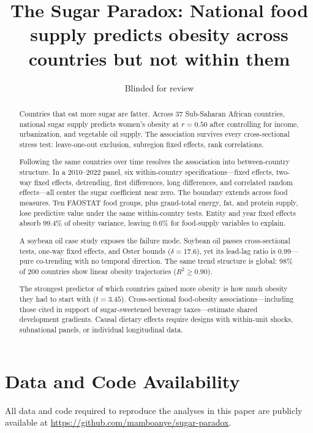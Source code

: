 \documentclass[11pt]{article}
\title{The Sugar Paradox: National food supply predicts obesity across countries but not within them}
\author{Blinded for review}
\date{}
\begin{document}
\maketitle

\begin{abstract}
Countries that eat more sugar are fatter.
Across 37 Sub-Saharan African countries, national sugar supply predicts women's obesity at $r = 0.50$ after controlling for income, urbanization, and vegetable oil supply.
The association survives every cross-sectional stress test: leave-one-out exclusion, subregion fixed effects, rank correlations.

Following the same countries over time resolves the association into between-country structure.
In a 2010--2022 panel, six within-country specifications---fixed effects, two-way fixed effects, detrending, first differences, long differences, and correlated random effects---all center the sugar coefficient near zero.
The boundary extends across food measures. Ten FAOSTAT food groups, plus grand-total energy, fat, and protein supply, lose predictive value under the same within-country tests. Entity and year fixed effects absorb 99.4\% of obesity variance, leaving 0.6\% for food-supply variables to explain.

A soybean oil case study exposes the failure mode. Soybean oil passes cross-sectional tests, one-way fixed effects, and Oster bounds ($\delta = 17.6$), yet its lead-lag ratio is 0.99---pure co-trending with no temporal direction. The same trend structure is global: 98\% of 200 countries show linear obesity trajectories ($R^2 \geq 0.90$).

The strongest predictor of which countries gained more obesity is how much obesity they had to start with ($t = 3.45$). Cross-sectional food-obesity associations---including those cited in support of sugar-sweetened beverage taxes---estimate shared development gradients. Causal dietary effects require designs with within-unit shocks, subnational panels, or individual longitudinal data.
\end{abstract}









\section*{Data and Code Availability}
All data and code required to reproduce the analyses in this paper are publicly available at \url{https://github.com/mamboanye/sugar-paradox}.



\end{document}
